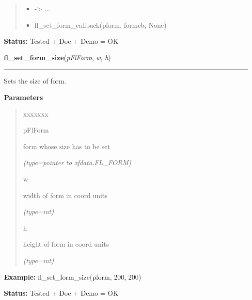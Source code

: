 \begin{boxedminipage}{\funcwidth}
\begin{quote}
\begin{itemize}
  \item {\textbar}-{\textgreater}{\textbar} ...



  \item fl\_set\_form\_callback(pform, formcb, None)



\end{itemize}

\end{quote}

\textbf{Status:} Tested + Doc + Demo = OK



    \end{boxedminipage}

    \label{xformslib:flbasic:fl_set_form_size}

    \vspace{0.5ex}

\hspace{.8\funcindent}\begin{boxedminipage}{\funcwidth}

    \raggedright \textbf{fl\_set\_form\_size}(\textit{pFlForm}, \textit{w}, \textit{h})

    \vspace{-1.5ex}

    \rule{\textwidth}{0.5\fboxrule}
\setlength{\parskip}{2ex}
    Sets the size of form.

\setlength{\parskip}{1ex}
      \textbf{Parameters}
      \vspace{-1ex}

      \begin{quote}
        \begin{Ventry}{xxxxxxx}

          \item[pFlForm]

          form whose size has to be set

            {\it (type=pointer to xfdata.FL\_FORM)}

          \item[w]

          width of form in coord units

            {\it (type=int)}

          \item[h]

          height of form in coord units

            {\it (type=int)}

        \end{Ventry}

      \end{quote}

\textbf{Example:} fl\_set\_form\_size(pform, 200, 200)



\textbf{Status:} Tested + Doc + Demo = OK



    \end{boxedminipage}

